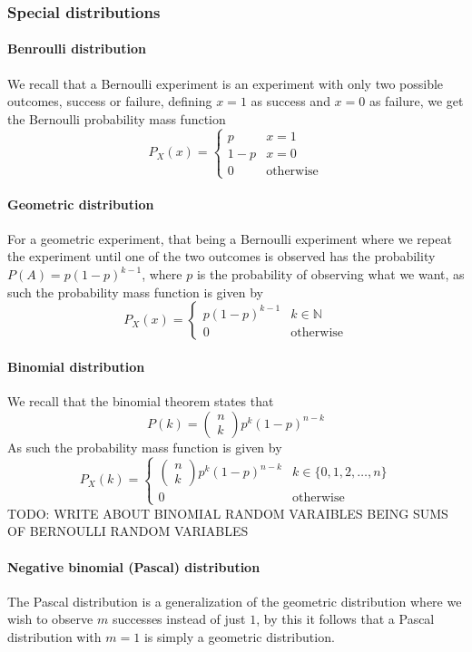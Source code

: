 \subsubsection{Special distributions}
\paragraph{Benroulli distribution}
We recall that a Bernoulli experiment is an experiment with only two possible outcomes, success or failure, defining $x=1$ as success and $x=0$ as failure, we get the Bernoulli probability mass function
\[
    P_{X}(x)=\begin{cases}p & x=1 \\ 1-p & x=0 \\ 0 & \text{otherwise}\end{cases}
\]
\paragraph{Geometric distribution}
For a geometric experiment, that being a Bernoulli experiment where we repeat the experiment until one of the two outcomes is observed has the probability $P(A)=p(1-p)^{k-1}$, where $p$ is the probability of observing what we want, as such the probability mass function is given by
\[
    P_{X}(x)=\begin{cases}p(1-p)^{k-1} & k\in \mathbb{N} \\ 0 & \text{otherwise}\end{cases}
\]
\paragraph{Binomial distribution}
We recall that the binomial theorem states that
\[
    P(k)=\begin{pmatrix}n\\k\end{pmatrix}p^{k}(1-p)^{n-k}
\]
As such the probability mass function is given by
\[
    P_{X}(k)=\begin{cases}\begin{pmatrix}n\\k\end{pmatrix}p^{k}(1-p)^{n-k} & k\in\{0,1,2,\ldots,n\} \\ 0 & \text{otherwise}\end{cases}
\]
TODO: WRITE ABOUT BINOMIAL RANDOM VARAIBLES BEING SUMS OF BERNOULLI RANDOM VARIABLES
\paragraph{Negative binomial (Pascal) distribution}
The Pascal distribution is a generalization of the geometric distribution where we wish to observe $m$ successes instead of just $1$, by this it follows that a Pascal distribution with $m=1$ is simply a geometric distribution.

